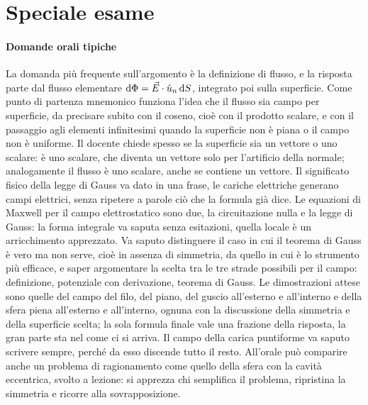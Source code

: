 \documentclass[11pt,a4paper]{article}
\begin{document}
\section*{Speciale esame}

\paragraph*{Domande orali tipiche}
La domanda più frequente sull'argomento è la definizione di flusso, e la risposta parte dal flusso elementare $\mathrm{d}\Phi=\vec{E}\cdot\hat{u}_n\,\mathrm{d} S$, integrato poi sulla superficie. Come punto di partenza mnemonico funziona l'idea che il flusso sia campo per superficie, da precisare subito con il coseno, cioè con il prodotto scalare, e con il passaggio agli elementi infinitesimi quando la superficie non è piana o il campo non è uniforme. Il docente chiede spesso se la superficie sia un vettore o uno scalare: è uno scalare, che diventa un vettore solo per l'artificio della normale; analogamente il flusso è uno scalare, anche se contiene un vettore. Il significato fisico della legge di Gauss va dato in una frase, le cariche elettriche generano campi elettrici, senza ripetere a parole ciò che la formula già dice. Le equazioni di Maxwell per il campo elettrostatico sono due, la circuitazione nulla e la legge di Gauss: la forma integrale va saputa senza esitazioni, quella locale è un arricchimento apprezzato. Va saputo distinguere il caso in cui il teorema di Gauss è vero ma non serve, cioè in assenza di simmetria, da quello in cui è lo strumento più efficace, e saper argomentare la scelta tra le tre strade possibili per il campo: definizione, potenziale con derivazione, teorema di Gauss. Le dimostrazioni attese sono quelle del campo del filo, del piano, del guscio all'esterno e all'interno e della sfera piena all'esterno e all'interno, ognuna con la discussione della simmetria e della superficie scelta; la sola formula finale vale una frazione della risposta, la gran parte sta nel come ci si arriva. Il campo della carica puntiforme va saputo scrivere sempre, perché da esso discende tutto il resto. All'orale può comparire anche un problema di ragionamento come quello della sfera con la cavità eccentrica, svolto a lezione: si apprezza chi semplifica il problema, ripristina la simmetria e ricorre alla sovrapposizione.
\end{document}
